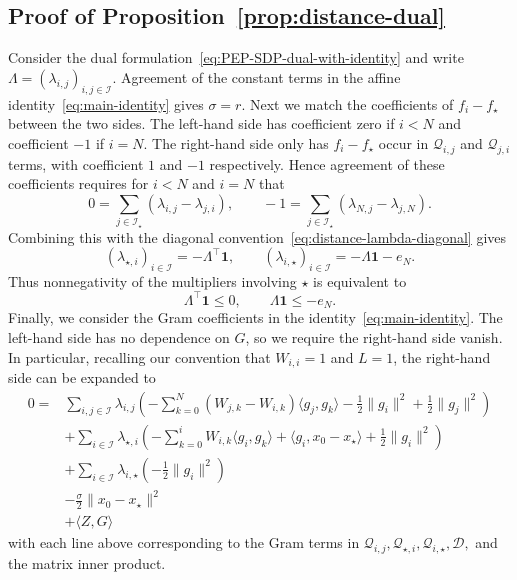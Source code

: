 \documentclass[11pt]{article}
\begin{document}
\subsection{Proof of Proposition~\ref{prop:distance-dual}}
\label{app:distance-dual}
Consider the dual formulation~\eqref{eq:PEP-SDP-dual-with-identity} and
write $\Lambda=(\lambda_{i,j})_{i,j\in\mathcal I}$. Agreement of the constant
terms in the affine identity~\eqref{eq:main-identity} gives $\sigma=r$. Next we match the coefficients of
$f_i-f_\star$ between the two sides. The left-hand side has coefficient zero if $i<N$ and coefficient $-1$ if $i=N$. The right-hand side only has $f_i-f_\star$ occur in $\mathcal{Q}_{i,j}$ and $\mathcal{Q}_{j,i}$ terms, with coefficient $1$ and $-1$ respectively. Hence agreement of these coefficients requires for $i<N$ and $i=N$ that
\begin{equation} \label{eq:f_i-coefficient-cond}
    0 = \sum_{j\in\mathcal{I}_\star} (\lambda_{i,j} - \lambda_{j,i}), \qquad -1 = \sum_{j\in\mathcal{I}_\star} (\lambda_{N,j} - \lambda_{j,N}).
\end{equation}
Combining this with the diagonal convention~\eqref{eq:distance-lambda-diagonal} gives
\[
    (\lambda_{\star,i})_{i\in\mathcal I}
    =-\Lambda^\top\mathbf1,
    \qquad
    (\lambda_{i,\star})_{i\in\mathcal I}
    =-\Lambda\mathbf1-e_N.
\]
Thus nonnegativity of the multipliers involving $\star$ is equivalent to
\[
    \Lambda^\top\mathbf1\leq0,
    \qquad
    \Lambda\mathbf1\leq-e_N.
\]
Finally, we consider the Gram coefficients in the identity~\eqref{eq:main-identity}. The left-hand side has no dependence on $G$, so we require the right-hand side vanish. In particular, recalling our convention that $W_{i,i}=1$ and $L=1$, the right-hand side can be expanded to
\begin{align*}
    0 =&\sum_{i,j\in\mathcal{I}} \lambda_{i,j}\left(-\sum_{k=0}^N (W_{j,k} - W_{i,k})\langle g_j, g_k\rangle - \frac{1}{2}\|g_i\|^2 + \frac{1}{2}\|g_j\|^2\right) \\
    &+\sum_{i\in\mathcal{I}} \lambda_{\star,i}\left(-\sum_{k=0}^{i} W_{i,k}\langle g_i,g_k\rangle + \langle g_i, x_0-x_\star\rangle + \frac{1}{2}\|g_i\|^2\right) \\
    &+\sum_{i\in\mathcal{I}} \lambda_{i,\star}\left(- \frac{1}{2}\|g_i\|^2\right) \\
    &-\frac{\sigma}{2}\|x_0-x_\star\|^2 \\
    &+\langle Z,G \rangle
\end{align*}
with each line above corresponding to the Gram terms in $\mathcal{Q}_{i,j},\mathcal{Q}_{\star,i},\mathcal{Q}_{i,\star},\mathcal{D},$ and the matrix inner product.
\end{document}
